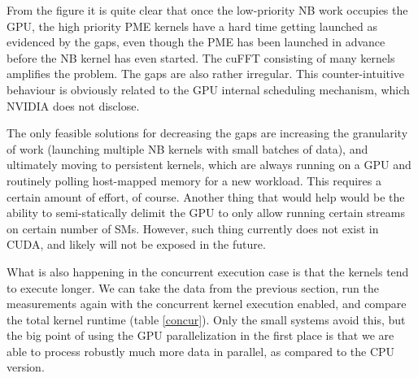 \documentclass[12pt,a4paper]{report}
\begin{document}
From the figure it is quite clear that once the low-priority NB work occupies the GPU, the high priority PME kernels have a hard time getting launched as evidenced by the gaps, even though the PME has been launched in advance before the NB kernel has even started. The cuFFT consisting of many kernels amplifies the problem. The gaps are also rather irregular. This counter-intuitive behaviour is obviously related to the GPU internal scheduling mechanism, which NVIDIA does not disclose. 

The only feasible solutions for decreasing the gaps are increasing the granularity of work (launching multiple NB kernels with small batches of data), and ultimately moving to persistent kernels, which are always running on a GPU and routinely polling host-mapped memory for a new workload. This requires a certain amount of effort, of course. Another thing that would help would be the ability to semi-statically delimit the GPU to only allow running certain streams on certain number of SMs. However, such thing currently does not exist in CUDA, and likely will not be exposed in the future.

 What is also happening in the concurrent execution case is that the kernels tend to execute longer. We can take the data from the previous section, run the measurements again with the concurrent kernel execution enabled, and compare the total kernel runtime (table \ref{concur}). Only the small systems avoid this, but the big point of using the GPU parallelization in the first place is that we are able to process robustly much more data in parallel, as compared to the CPU version. 
 
\begin{table} 
\caption{Comparison of concurrent and non-concurrent PME GPU kernel runtime}
\label{concur}
\end{table}
\end{document}
